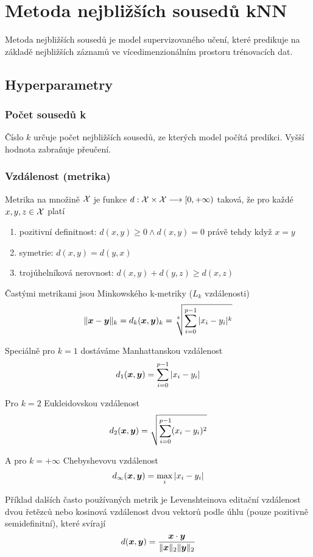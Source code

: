 \documentclass[../main.tex]{subfiles}
\begin{document}
\section{Metoda nejbližších sousedů kNN}

Metoda nejbližších sousedů je model supervizovaného učení, které predikuje na základě nejbližších záznamů ve vícedimenzionálním prostoru trénovacích dat.

\subsection{Hyperparametry}

\subsubsection{Počet sousedů k}

Číslo $k$ určuje počet nejbližších sousedů, ze kterých model počítá predikci. Vyšší hodnota zabraňuje přeučení.

\subsubsection{Vzdálenost (metrika)} \label{sec:metrika}

Metrika na množině $\mathcal{X}$ je funkce $d: \mathcal{X} \times \mathcal{X} \longrightarrow [0, +\infty)$ taková, že pro každé $x, y, z \in \mathcal{X}$ platí
\begin{enumerate}
    \item pozitivní definitnost: $d(x, y) \ge 0 \land d(x, y) = 0$ právě tehdy když $x = y$
    \item symetrie: $d(x,y) = d(y,x)$
    \item trojúhelníková nerovnost: $d(x, y) + d(y, z) \ge d(x, z)$
\end{enumerate}

Častými metrikami jsou Minkowského k-metriky ($L_k$ vzdálenosti)
\[
    \|\bm{x} - \bm{y}\|_k = d_k(\bm{x}, \bm{y})_k = \sqrt[k]{\sum_{i=0}^{p-1} |x_i - y_i|^k}
\]

Speciálně pro $k=1$ dostáváme Manhattanskou vzdálenost
\[
    d_1(\bm{x}, \bm{y}) = \sum_{i=0}^{p-1} |x_i - y_i|
\]

Pro $k=2$ Eukleidovskou vzdálenost
\[
    d_2(\bm{x}, \bm{y}) = \sqrt{\sum_{i=0}^{p-1} (x_i - y_i)^2}
\]

A pro $k=+\infty$ Chebyshevovu vzdálenost
\[
    d_{\infty}(\bm{x}, \bm{y}) = \max_i |x_i - y_i|
\]

Příklad dalších často používaných metrik je Levenshteinova editační vzdálenost dvou řetězců nebo kosinová vzdálenost dvou vektorů podle úhlu (pouze pozitivně semidefinitní), které svírají
\[
    d(\bm{x}, \bm{y}) = \frac{\bm{x} \cdot \bm{y}}{\|\bm{x}\|_2 \|\bm{y}\|_2}
\]
\end{document}
